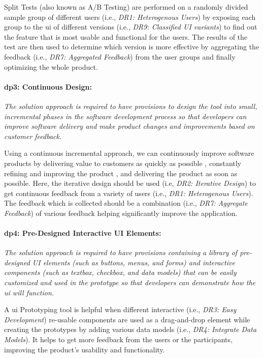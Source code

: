 Split Tests (also known as A/B Testing) are performed on a randomly divided sample group of different users (i.e., \textit{DR1: Heterogenous Users}) by exposing each group to the \ac{ui} of different versions (i.e., \textit{DR9: Classified UI variants}) to find out the feature that is most usable and functional for the users.
The results of the test are then used to determine which version is more effective by aggregating the feedback (i.e., \textit{DR7: Aggregated Feedback}) from the user groups and finally optimizing the whole product.

\paragraph{\ac{dp}3: Continuous Design:} \textit{The solution approach is required to have provisions to design the tool into small, incremental phases in the software development process so that developers can improve software delivery and make product changes and improvements based on customer feedback.}

Using a continuous incremental approach, we can continuously improve software products by delivering value to customers as quickly as possible \cite{misc:lean:toyota}, constantly refining and improving the product \cite{misc:lean:planning}, and delivering the product as soon as possible.
Here, the iterative design should be used (i.e, \textit{DR2: Iterative Design}) to get continuous feedback from a variety of users (i.e., \textit{DR1: Heterogenous Users}).
The feedback which is collected should be a combination (i.e., \textit{DR7: Aggregate Feedback}) of various feedback helping significantly improve the application.

\paragraph{\ac{dp}4: Pre-Designed Interactive UI Elements:} \textit{The solution approach is required to have provisions containing a library of pre-designed UI elements (such as buttons, menus, and forms) and interactive components (such as textbox, checkbox, and data models) that can be easily customized and used in the prototype so that developers can demonstrate how the \ac{ui} will function.}

A \ac{ui} Prototyping tool is helpful when different interactive (i.e., \textit{DR3: Easy Development}) re-usable components are used as a drag-and-drop element while creating the prototypes by adding various data models (i.e., \textit{DR4: Integrate Data Models}). 
It helps to get more feedback from the users or the participants, improving the product's usability and functionality.

